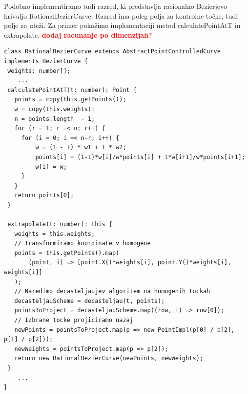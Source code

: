 \documentclass[isrm2, tisk]{fmfdelo}
\newcommand{\mycomment}[1]{\textbf{\textcolor{red}{#1}}}
\begin{document}
    Podobno implementiramo tudi razred, ki predstavlja racionalno Bezierjevo krivuljo RationalBezierCurve.
    Razred ima poleg polja za kontrolne točke, tudi polje za uteži.
    Za primer pokažimo implementaciji metod calculatePointAtT in  extrapolate.
    \mycomment{dodaj racunanje po dimenzijah?}
    \begin{lstlisting}[label={lst:rat-curve}]
class RationalBezierCurve extends AbstractPointControlledCurve implements BezierCurve {
 weights: number[];
    ...
 calculatePointAtT(t: number): Point {
   points = copy(this.getPoints());
   w = copy(this.weights):
   n = points.length  - 1;
   for (r = 1; r =< n; r++) {
     for (i = 0; i =< n-r; i++) {
         w = (1 - t) * w1 + t * w2;
         points[i] = (1-t)*w[i]/w*points[i] + t*w[i+1]/w*points[i+1];
         w[i] = w;
     }
   }
   return points[0];
 }

 extrapolate(t: number): this {
   weights = this.weights;
   // Transformiramo koordinate v homogene
   points = this.getPoints().map(
       (point, i) => [point.X()*weights[i], point.Y()*weights[i], weights[i]]
   );
   // Naredimo decasteljaujev algoritem na homogenih tockah
   decasteljauScheme = decasteljau(t, points);
   pointsToProject = decasteljauScheme.map((row, i) => row[0]);
   // Izbrane tocke projiciramo nazaj
   newPoints = pointsToProject.map(p => new PointImpl(p[0] / p[2], p[1] / p[2]));
   newWeights = pointsToProject.map(p => p[2]);
   return new RationalBezierCurve(newPoints, newWeights);
 }
    ...
}
    \end{lstlisting}
\end{document}
